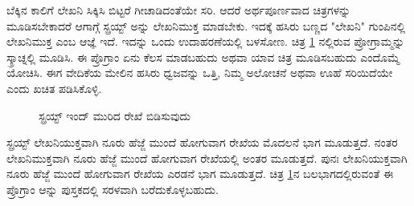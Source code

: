 ಬೆಕ್ಕಿನ ಕಾಲಿಗೆ ಲೇಖನಿ ಸಿಕ್ಕಿಸಿ ಬಿಟ್ಟರೆ ಗೀಚಾಡಿದಂತೆಯೇ ಸರಿ. ಆದರೆ ಅರ್ಥಪೂರ್ಣವಾದ ಚಿತ್ರಗಳನ್ನು ಮೂಡಿಸಬೇಕಾದರೆ ಆಗಾಗ್ಗೆ ಸ್ಪ್ರಯ್ಟ್ ಅನ್ನು ಲೇಖನಿಮುಕ್ತ ಮಾಡಬೇಕು.  ಇದಕ್ಕೆ ಹಸಿರು ಬಣ್ಣದ "ಲೇಖನಿ" ಗುಂಪಿನಲ್ಲಿ ಲೇಖನಿಮುಕ್ತ ಎಂಬ ಆಜ್ಞೆ ಇದೆ.  ಇದನ್ನು ಒಂದು ಉದಾಹರಣೆಯಲ್ಲಿ ಬಳಸೋಣ.  ಚಿತ್ರ \ref{pen_broken_line} ನಲ್ಲಿರುವ ಪ್ರೋಗ್ರಾಮ್ಮನ್ನು ಸ್ಕ್ರಾಚ್ನಲ್ಲಿ ಮೂಡಿಸಿ. ಈ ಪ್ರೊಗ್ರಾಂ ಏನು ಕೆಲಸ ಮಾಡಬಹುದು ಅಥವಾ ಯಾವ ಚಿತ್ರ ಮೂಡಿಸಬಹುದು ಎಂದೊಮ್ಮೆ ಯೋಚಿಸಿ.  ಈಗ ವೇದಿಕೆಯ ಮೇಲಿನ ಹಸಿರು ಧ್ವಜವನ್ನು ಒತ್ತಿ, ನಿಮ್ಮ ಅಲೋಚನೆ ಅಥವಾ ಊಹೆ ಸರಿಯಿದೆಯೇ ಎಂದು ಖಚಿತ ಪಡಿಸಿಕೊಳ್ಳಿ. 

\begin{figure}[h]
\begin{center}
\begin{multicols}{2}
\begin{Scratch}[1]
\beginbox{}
\end{Scratch}


\end{multicols}

\end{center}
\caption{ಸ್ಪ್ರಯ್ಟ್ ಇಂದ್ ಮುರಿದ ರೇಖೆ ಬಿಡಿಸುವುದು}
\label{pen_broken_line}
\end{figure}

ಸ್ಪ್ರಯ್ಟ್ ಲೇಖನಿಯುಕ್ತವಾಗಿ ನೂರು ಹೆಜ್ಜೆ ಮುಂದೆ ಹೋಗುವಾಗ ರೇಖೆಯ ಮೊದಲನೆ ಭಾಗ ಮೂಡುತ್ತದೆ.  ನಂತರ ಲೇಖನಿಮುಕ್ತವಾಗಿ ನೂರು ಹೆಜ್ಜೆ ಮುಂದೆ ಹೋಗುವಾಗ ರೇಖೆಯಲ್ಲಿ ಅಂತರ  ಮೂಡುತ್ತದೆ.  ಪುನಃ ಲೇಖನಿಯುಕ್ತವಾಗಿ ನೂರು ಹೆಜ್ಜೆ ಮುಂದೆ ಹೋಗುವಾಗ ರೇಖೆಯ ಎರಡನೆ  ಭಾಗ ಮೂಡುತ್ತದೆ.  ಚಿತ್ರ \ref{pen_broken_line}ನ ಬಲಭಾಗದಲ್ಲಿರುವಂತೆ  ಈ ಪ್ರೊಗ್ರಾಂ ಆನ್ನು ಪುಸ್ತಕದಲ್ಲಿ  ಸರಳವಾಗಿ ಬರೆದುಕೊಳ್ಳಬಹುದು.  

